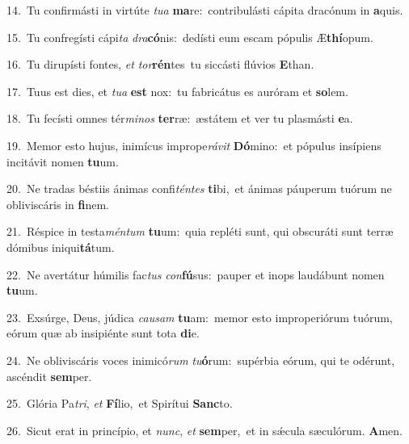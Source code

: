 {\numbfont\textcolor{\numbcolor}{14.}}~Tu confirmásti in virtúte \textit{tu}\-\textit{a} \textbf{ma}\-re:~\star contribulásti cápita dracónum in \textbf{a}\-quis.\par
{\numbfont\textcolor{\numbcolor}{15.}}~Tu confregísti cápi\textit{ta} \textit{dra}\-\textbf{có}nis:~\star dedísti eum escam pópulis Æ\-\textbf{thí}\-opum.\par
{\numbfont\textcolor{\numbcolor}{16.}}~Tu dirupísti fontes, \textit{et} \textit{tor}\-\textbf{rén}tes~\star tu siccásti flúvios \textbf{E}\-than.\par
{\numbfont\textcolor{\numbcolor}{17.}}~Tuus est dies, et \textit{tu}\-\textit{a} \textbf{est} nox:~\star tu fabricátus es auróram et \textbf{so}\-lem.\par
{\numbfont\textcolor{\numbcolor}{18.}}~Tu fecísti omnes tér\-\textit{mi}\-\textit{nos} \textbf{ter}\-ræ:~\star æstátem et ver tu plasmásti \textbf{e}\-a.\par
{\numbfont\textcolor{\numbcolor}{19.}}~Memor esto hujus, inimícus imprope\-\textit{rá}\-\textit{vit} \textbf{Dó}\-mino:~\star et pópulus insípiens incitávit nomen \textbf{tu}\-um.\par
{\numbfont\textcolor{\numbcolor}{20.}}~Ne tradas béstiis ánimas confi\-\textit{tén}\-\textit{tes} \textbf{ti}\-bi,~\star et ánimas páuperum tuórum ne obliviscáris in \textbf{fi}\-nem.\par
{\numbfont\textcolor{\numbcolor}{21.}}~Réspice in testa\-\textit{mén}\-\textit{tum} \textbf{tu}\-um:~\star quia repléti sunt, qui obscuráti sunt terræ dómibus iniqui\-\textbf{tá}\-tum.\par
{\numbfont\textcolor{\numbcolor}{22.}}~Ne avertátur húmilis fac\textit{tus} \textit{con}\-\textbf{fú}sus:~\star pauper et inops laudábunt nomen \textbf{tu}\-um.\par
{\numbfont\textcolor{\numbcolor}{23.}}~Exsúrge, Deus, júdica \textit{cau}\-\textit{sam} \textbf{tu}\-am:~\star memor esto improperiórum tuórum, eórum quæ ab insipiénte sunt tota \textbf{di}\-e.\par
{\numbfont\textcolor{\numbcolor}{24.}}~Ne obliviscáris voces inimicó\textit{rum} \textit{tu}\-\textbf{ó}rum:~\star supérbia eórum, qui te odérunt, ascéndit \textbf{sem}\-per.\par
{\numbfont\textcolor{\numbcolor}{25.}}~Glória Pa\-\textit{tri}\-, \textit{et} \textbf{Fí}\-lio,~\star et Spirítui \textbf{Sanc}\-to.\par
{\numbfont\textcolor{\numbcolor}{26.}}~Sicut erat in princípio, et \textit{nunc}\-, \textit{et} \textbf{sem}\-per,~\star et in sǽcula sæculórum. \textbf{A}\-men.\par
